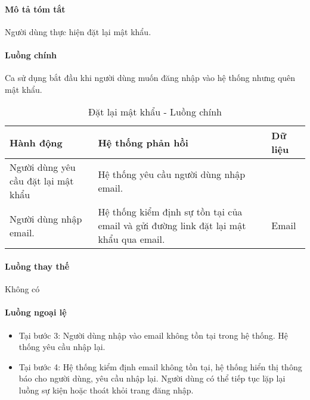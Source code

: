\documentclass[./../main.tex]{subfiles}
\begin{document}
\paragraph*{Mô tả tóm tắt}

Người dùng thực hiện đặt lại mật khẩu.


\paragraph*{Luồng chính} Ca sử dụng bắt đầu khi người dùng muốn đăng nhập vào
hệ thống nhưng quên mật khẩu.

\begin{table}[H]
  \caption{Đặt lại mật khẩu - Luồng chính}
  \label{tab:reset_password}
  \begin{tabularx}{\textwidth}{|X|X|X|}
  \hline
  \textbf{Hành động}                  & \textbf{Hệ thống phản hồi}                                                            & \textbf{Dữ liệu} \\ \hline
  Người dùng yêu cầu đặt lại mật khẩu & Hệ thống yêu cầu người dùng nhập email.                                               &                  \\ \hline
  Người dùng nhập email.              & Hệ thống kiểm định sự tồn tại của email và gửi đường link đặt lại mật khẩu qua email. & Email           \\ \hline
  \end{tabularx}
\end{table}

\paragraph*{Luồng thay thế} Không có

\paragraph*{Luồng ngoại lệ}

\begin{itemize}
\item
  
  Tại bước 3: Người dùng nhập vào email không tồn tại trong hệ thống. Hệ
  thống yêu cầu nhập lại.
  
\item
  
  Tại bước 4: Hệ thống kiểm định email không tồn tại, hệ thống hiển thị
  thông báo cho người dùng, yêu cầu nhập lại. Người dùng có thể tiếp tục
  lặp lại luồng sự kiện hoặc thoát khỏi trang đăng nhập.
  
\end{itemize}
\end{document}
